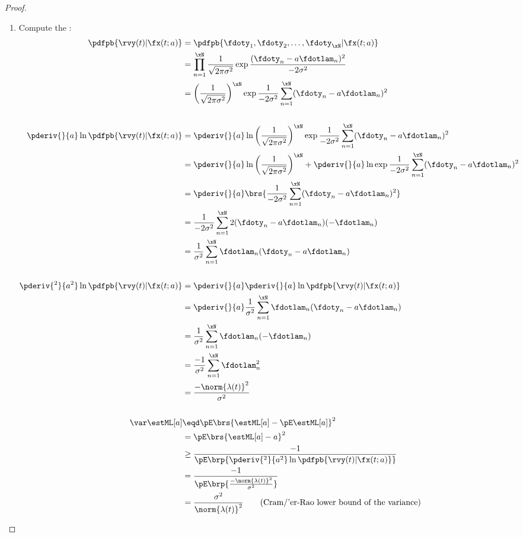 \begin{proof}
\begin{enumerate}
\item Compute the :
\begin{align*}
   \pdfpb{\rvy(t)|\fx(t; a)}
     &=  \pdfpb{\fdoty_1, \fdoty_2,\ldots,\fdoty_{\xN}|\fx(t; a)}
   \\&=  \prod_{n=1}^\xN \frac{1}{\sqrt{2\pi\sigma^2}}
          \exp{\frac{(\fdoty_n- a\fdotlam_n)^2}{-2\sigma^2}}
   \\&=  \left(\frac{1}{\sqrt{2\pi\sigma^2}}\right)^\xN
          \exp{\frac{1}{-2\sigma^2} \sum_{n=1}^\xN (\fdoty_n- a\fdotlam_n)^2}
\\
\\
   \pderiv{}{a}\ln\pdfpb{\rvy(t)|\fx(t; a)}
     &=  \pderiv{}{a}\ln
          \left(\frac{1}{\sqrt{2\pi\sigma^2}}\right)^\xN
          \exp{\frac{1}{-2\sigma^2} \sum_{n=1}^\xN (\fdoty_n- a\fdotlam_n)^2}
   \\&=  \pderiv{}{a}\ln
          \left(\frac{1}{\sqrt{2\pi\sigma^2}}\right)^\xN
       +  \pderiv{}{a}\ln
          \exp{\frac{1}{-2\sigma^2} \sum_{n=1}^\xN (\fdoty_n- a\fdotlam_n)^2}
   \\&=  \pderiv{}{a}
          \brs{\frac{1}{-2\sigma^2} \sum_{n=1}^\xN (\fdoty_n- a\fdotlam_n)^2}
   \\&=  \frac{1}{-2\sigma^2} \sum_{n=1}^\xN 2(\fdoty_n- a\fdotlam_n)(- \fdotlam_n)
   \\&=  \frac{1}{\sigma^2} \sum_{n=1}^\xN \fdotlam_n(\fdoty_n- a\fdotlam_n)
\\
\\
   \pderiv{^2}{a^2}\ln\pdfpb{\rvy(t)|\fx(t; a)}
     &=  \pderiv{}{a}\pderiv{}{a}\ln\pdfpb{\rvy(t)|\fx(t; a)}
   \\&=  \pderiv{}{a}
          \frac{1}{\sigma^2} \sum_{n=1}^\xN \fdotlam_n(\fdoty_n- a\fdotlam_n)
   \\&=  \frac{1}{\sigma^2} \sum_{n=1}^\xN \fdotlam_n(-\fdotlam_n)
   \\&=  \frac{-1}{\sigma^2} \sum_{n=1}^\xN \fdotlam_n^2
   \\&=  \frac{-\norm{\lambda(t)}^2}{\sigma^2}
\\
\\
   \var\estML[a]
     &\eqd \pE\brs{\estML[a]-\pE\estML[a]}^2
   \\&=    \pE\brs{\estML[a]- a}^2
   \\&\ge  \frac{-1}{\pE\brp{\pderiv{^2}{ a^2} \ln \pdfpb{\rvy(t)|\fx(t; a)}}}
   \\&=    \frac{-1}{\pE\brp{\frac{-\norm{\lambda(t)}^2}{\sigma^2}}}
   \\&=    \frac{\sigma^2}{\norm{\lambda(t)}^2}
     \qquad\text{(Cram/'er-Rao lower bound of the variance)}
\end{align*}


\end{enumerate}
\end{proof}
